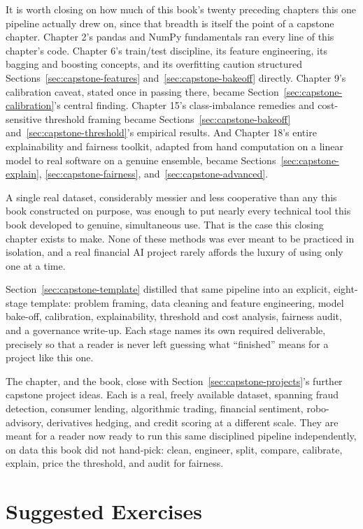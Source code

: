 \documentclass[../ai_in_finance]{subfiles}
\begin{document}
It is worth closing on how much of this book's twenty preceding chapters this one pipeline actually drew on, since that breadth is itself the point of a capstone chapter. Chapter 2's pandas and NumPy fundamentals ran every line of this chapter's code. Chapter 6's train/test discipline, its feature engineering, its bagging and boosting concepts, and its overfitting caution structured Sections~\ref{sec:capstone-features} and~\ref{sec:capstone-bakeoff} directly. Chapter 9's calibration caveat, stated once in passing there, became Section~\ref{sec:capstone-calibration}'s central finding. Chapter 15's class-imbalance remedies and cost-sensitive threshold framing became Sections~\ref{sec:capstone-bakeoff} and~\ref{sec:capstone-threshold}'s empirical results. And Chapter 18's entire explainability and fairness toolkit, adapted from hand computation on a linear model to real software on a genuine ensemble, became Sections~\ref{sec:capstone-explain}, \ref{sec:capstone-fairness}, and~\ref{sec:capstone-advanced}.

A single real dataset, considerably messier and less cooperative than any this book constructed on purpose, was enough to put nearly every technical tool this book developed to genuine, simultaneous use. That is the case this closing chapter exists to make. None of these methods was ever meant to be practiced in isolation, and a real financial AI project rarely affords the luxury of using only one at a time.

Section~\ref{sec:capstone-template} distilled that same pipeline into an explicit, eight-stage template: problem framing, data cleaning and feature engineering, model bake-off, calibration, explainability, threshold and cost analysis, fairness audit, and a governance write-up. Each stage names its own required deliverable, precisely so that a reader is never left guessing what ``finished'' means for a project like this one.

The chapter, and the book, close with Section~\ref{sec:capstone-projects}'s further capstone project ideas. Each is a real, freely available dataset, spanning fraud detection, consumer lending, algorithmic trading, financial sentiment, robo-advisory, derivatives hedging, and credit scoring at a different scale. They are meant for a reader now ready to run this same disciplined pipeline independently, on data this book did not hand-pick: clean, engineer, split, compare, calibrate, explain, price the threshold, and audit for fairness.

\section{Suggested Exercises}
\end{document}
